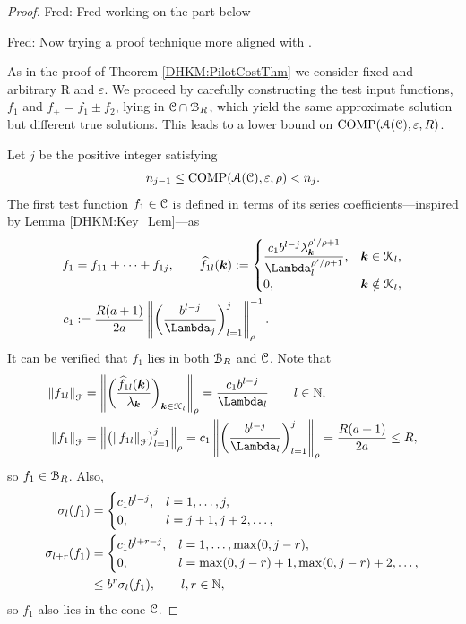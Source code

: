\documentclass[USenglish]{article}
\theoremstyle{dgthm}
\theoremstyle{dgthm}
\theoremstyle{dgthm}
\theoremstyle{dgthm}
\theoremstyle{dgdef}
\theoremstyle{definition}
\DeclareMathOperator{\COMP}{COMP}
\newcommand{\hf}{\widehat{f}}
\newcommand{\norm}[2][{}]{\ensuremath{\left \lVert #2 \right \rVert}_{#1}}
\newcommand{\FredNote}[1]{{\color{blue}Fred: #1}}
\begin{document}
\begin{proof}
\FredNote{Fred working on the part below}

\FredNote{Now trying a proof technique more aligned with \cite{DinHic20a}.}

As in the proof of Theorem \ref{DHKM:PilotCostThm} we consider fixed and arbitrary R and $\varepsilon$.
We proceed by carefully constructing the test input functions, $f_1$ and $f_{\pm} = f_1 \pm f_2$, lying in ${\mathcal{C}} \cap {\mathcal{B}}_{R}$, which yield the same approximate solution but different true solutions.  This leads to a lower bound on $\COMP(\calA(\calC),\varepsilon,R)$. 

Let $j$ be the positive integer satisfying 
\[
n_{j-1} \le \COMP(\calA(\calC),\varepsilon,\rho) < n_j.
\]  
The first test function $f_1 \in {\mathcal{C}}$ is defined in terms of its series coefficients---inspired by Lemma \ref{DHKM:Key_Lem}---as
\begin{align}
\nonumber
f_1 &= f_{11} + \cdots + f_{1j}, \qquad
\hf_{1l}(\bsk) := \begin{cases}
\displaystyle
\frac{c_1 b^{l-j} \lambda_{\bsk}^{\rho'/\rho+1}}{\Lambda_l^{\rho'/\rho+1}},  & \bsk \in \calK_l,
\\
0, & \bsk \notin \calK_l,
\end{cases}
\\
\nonumber
c_1 &:=  \frac{R(a+1)}{2a} \norm[\rho]{ \biggl(\frac{b^{l-j}}{\Lambda_j} \biggr)_{l=1}^j }^{-1}.
\end{align}
It can be verified that $f_1$ lies in both ${\mathcal{B}}_{R}$ and ${\mathcal{C}}$.  Note that 
\begin{align}
\nonumber
\norm[\calF]{f_{1l}} &= \norm[\rho]{\biggl(\frac{\hf_{1l}(\bsk)}{\lambda_{\bsk}} \biggr)_{\bsk \in \calK_l}} 
= \frac{c_1 b^{l-j}}{\Lambda_l} \qquad l \in \N,\\
\nonumber
\norm[\calF]{f_1} &= \norm[\rho]{\bigl( \norm[\calF]{f_{1l}} \bigr)_{l=1}^{j} } 
=  c_1 \norm[\rho]{ \biggl(\frac{b^{l-j}}{\Lambda_l} \biggr)_{l=1}^{j} } = \frac{R(a+1)}{2a} \le R,
\end{align}
so $f_1 \in {\mathcal{B}}_R$.  Also,
\begin{align}
\nonumber
\sigma_l(f_1) &= \begin{cases}
c_1 b^{l-j}, & l=1, \ldots, j, \\
0, & l=j+1, j+2, \ldots,
\end{cases}
\\
\nonumber
\sigma_{l+r}(f_1) &= 
\begin{cases}
c_1 b^{l+r - j}, & l=1, \ldots, \max(0,j-r), \\
0, & l = \max(0,j-r)+1, \max(0,j-r) +2, \ldots, 
\end{cases}
\\
\nonumber 
& \leq b^r \sigma_l(f_1), \qquad l,r \in {\mathbb{N}},
\end{align}
so $f_1$ also lies in the cone ${\mathcal{C}}$.




\end{proof}
\end{document}
